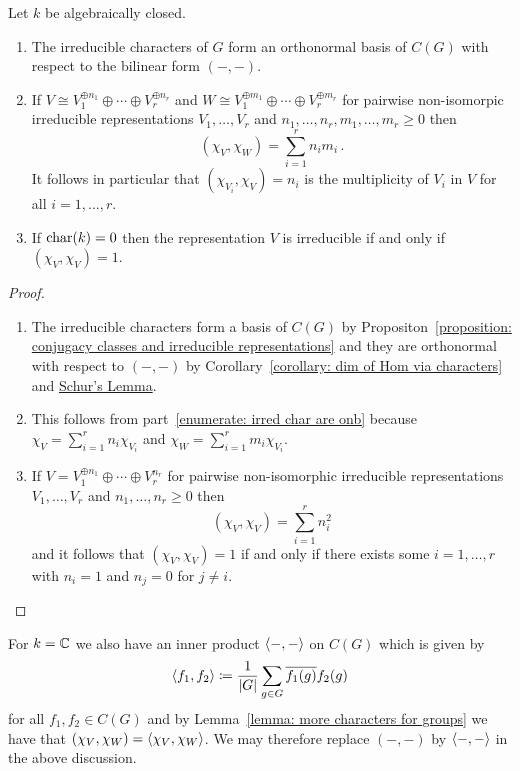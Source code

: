 \begin{theorem}
  Let $k$ be algebraically closed.
  \begin{enumerate}
    \item
      \label{enumerate: irred char are onb}
      The irreducible characters of $G$ form an orthonormal basis of $C(G)$ with respect to the bilinear form $(-,-)$.
    \item
      If $V \cong V_1^{\oplus n_1} \oplus \dotsb \oplus V_r^{\oplus n_r}$ and $W \cong V_1^{\oplus m_1} \oplus \dotsb \oplus V_r^{\oplus m_r}$ for pairwise non-isomorpic irreducible representations $V_1, \dotsc, V_r$ and $n_1, \dotsc, n_r, m_1, \dotsc, m_r \geq 0$ then
      \[
          (\chi_V, \chi_W)
        = \sum_{i=1}^r n_i m_i \,.
      \]
      It follows in particular that $(\chi_{V_i}, \chi_V) = n_i$ is the multiplicity of $V_i$ in $V$ for all $i = 1, \dotsc, r$.
    \item
      If $\operatorname{char}(k) = 0$ then the representation $V$ is irreducible if and only if $(\chi_V, \chi_V) = 1$.
  \end{enumerate}
\end{theorem}


\begin{proof}
  \leavevmode
  \begin{enumerate}
    \item
      The irreducible characters form a basis of $C(G)$ by Propositon~\ref{proposition: conjugacy classes and irreducible representations} and they are orthonormal with respect to $(-,-)$ by Corollary~\ref{corollary: dim of Hom via characters} and \hyperref[proposition: Schurs lemma representations]{Schur’s Lemma}.
    \item
      This follows from part~\ref*{enumerate: irred char are onb} because $\chi_V = \sum_{i=1}^r n_i \chi_{V_i}$ and $\chi_W = \sum_{i=1}^r m_i \chi_{V_i}$.
    \item 
      If $V = V_1^{\oplus n_1} \oplus \dotsb \oplus V_r^{n_r}$ for pairwise non-isomorphic irreducible representations $V_1, \dotsc, V_r$ and $n_1, \dotsc, n_r \geq 0$ then
      \[
          ( \chi_V, \chi_V )
        = \sum_{i=1}^r n_i^2
      \]
      and it follows that $(\chi_V, \chi_V) = 1$ if and only if there exists some $i = 1, \dotsc, r$ with $n_i = 1$ and $n_j = 0$ for $j \neq i$.
    \qedhere
  \end{enumerate}
\end{proof}




\begin{fluff}
  For $k = \mathbb{C}$ we also have an inner product $\langle -,- \rangle$ on $C(G)$ which is given by
  \[
              \langle f_1, f_2 \rangle
    \coloneqq  \frac{1}{|G|} \sum_{g \in G} \overline{f_1(g)} f_2(g)
  \]
  for all $f_1, f_2 \in C(G)$ and by Lemma~\ref{lemma: more characters for groups} we have that $(\chi_V, \chi_W) = \langle \chi_V, \chi_W \rangle$.
   We may therefore replace $(-,-)$ by $\langle -,- \rangle$ in the above discussion.
\end{fluff}




